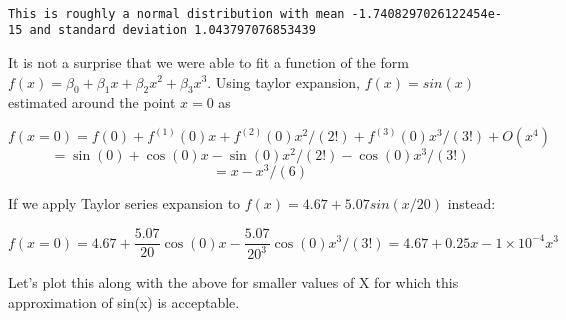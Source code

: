 \documentclass[11pt]{article}
\begin{document}
    \begin{center}
    \end{center}
    { \hspace*{\fill} \\}
    
    \begin{Verbatim}[commandchars=\\\{\}]
This is roughly a normal distribution with mean -1.7408297026122454e-15 and standard deviation 1.043797076853439

    \end{Verbatim}

    It is not a surprise that we were able to fit a function of the form
\(f(x) = \beta_0 + \beta_1 x + \beta_2 x^2 + \beta_3 x^3\). Using taylor
expansion, \(f(x) = sin(x)\) estimated around the point \(x=0\) as

\[f(x=0) = f(0) + f^{(1)}(0)x + f^{(2)}(0)x^2/(2!) + f^{(3)}(0)x^3/(3!) + O(x^4)\]
\[= \sin(0) + \cos(0)x - \sin(0)x^2/(2!) -\cos(0)x^3/(3!)\]
\[= x - x^3/(6)\]

If we apply Taylor series expansion to \(f(x) = 4.67 + 5.07 sin(x/20)\)
instead:

\[f(x=0) = 4.67 + \frac{5.07}{20}\cos(0)x-\frac{5.07}{20^3}\cos(0)x^3/(3!)=4.67 + 0.25x - 1 \times 10^{-4} x^3\]

Let's plot this along with the above for smaller values of X for which
this approximation of sin(x) is acceptable.
\end{document}
